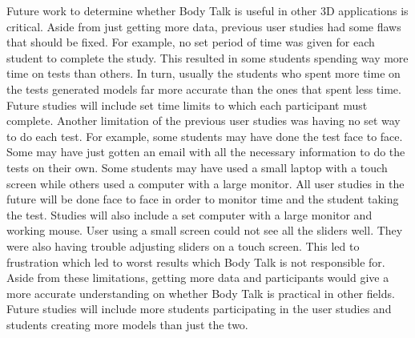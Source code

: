\documentclass[journal]{vgtc}                %
\begin{document}
\noindent Future work to determine whether Body Talk is useful in other 3D applications is critical. Aside from just getting more data,
previous user studies had some flaws that should be fixed.
\newline \newline
\noindent For example, no set period of time was given for each student to complete the study. This resulted in some students spending
way more time on tests than others. In turn, usually the students who spent more time on the tests generated models far more accurate
than the ones that spent less time. Future studies will include set time limits to which each participant must complete.
\newline\newline
\noindent Another limitation of the previous user studies was having no set way to do each test. For example, some students may have
done the test face to face. Some may have just gotten an email with all the necessary information to do the tests on their own. Some
students may have used a small laptop with a touch screen while others used a computer with a large monitor. All user studies in the
future will be done face to face in order to monitor time and the student taking the test. Studies will also include a set computer with
a large monitor and working mouse. User using a small screen could not see all the sliders well. They were also having trouble adjusting
sliders on a touch screen. This led to frustration which led to worst results which Body Talk is not responsible for.
\newline\newline
\noindent Aside from these limitations, getting more data and participants would give a more accurate understanding on whether Body Talk
is practical in other fields. Future studies will include more students participating in the user studies and students creating more
models than just the two.
\end{document}
